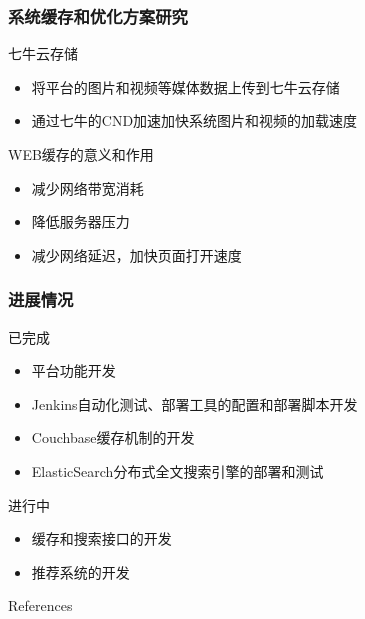 \documentclass{beamer}
\begin{document}
\begin{frame}
\frametitle{系统缓存和优化方案研究}
  \begin{block}{七牛云存储}
    \begin{itemize}
      \item 将平台的图片和视频等媒体数据上传到七牛云存储
      \item 通过七牛的CND加速加快系统图片和视频的加载速度
    \end{itemize} 
  \end{block}
  \begin{block}{WEB缓存的意义和作用}
    \begin{itemize}
      \item 减少网络带宽消耗
      \item 降低服务器压力
      \item 减少网络延迟，加快页面打开速度
    \end{itemize} 
  \end{block}
\end{frame}
\begin{frame}
\frametitle{进展情况}
  \begin{block}{已完成 }
	\begin{itemize}
		\item 平台功能开发
		\item Jenkins自动化测试、部署工具的配置和部署脚本开发
        		\item Couchbase缓存机制的开发
		\item ElasticSearch分布式全文搜索引擎的部署和测试
	\end{itemize}
  \end{block}
  \pause %
  \begin{block}{进行中}
	\begin{itemize}
    \item 缓存和搜索接口的开发
    \item 推荐系统的开发
	\end{itemize}
  \end{block}
\end{frame}


\begin{frame}[allowframebreaks]{References}
  \scriptsize
  
  
\end{frame}
\end{document}
